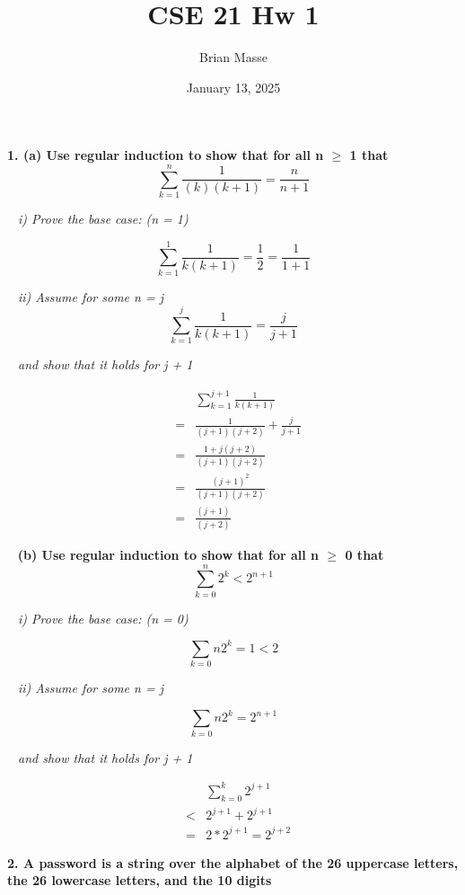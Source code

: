 \documentclass[12pt, letterpaper]{article}
\title{CSE 21 Hw 1}
\author{Brian Masse}
\date{January 13, 2025}
\begin{document}
\maketitle
\newpage

\bf{ 1. (a) Use regular induction to show that for all n $\ge$ 1 that }
\[ \sum_{k=1}^{n} \frac{1}{(k)(k+1)} = \frac{n}{n+1}  \]

\-\ \it{ i) Prove the base case: (n = 1) }

\[ \sum_{k=1}^{1} \frac{1}{k( k + 1 )} = \frac{1}{2} = \frac{1}{1 + 1} \]

\-\ \it{ ii) Assume for some n = j  }
\[ \sum_{k=1}^{j} \frac{1}{k( k + 1 )} = \frac{j}{j + 1}\]

\-\ \it{ and show that it holds for j + 1  }

\begin{eqnarray}
&& \sum_{k=1}^{j + 1} \frac{1}{k( k + 1 )}\\
&=& \frac{1}{(j + 1)(j + 2)} + \frac{j}{j + 1}\\
&=& \frac{1 + j(j + 2)}{(j + 1)(j + 2)} \\
&=& \frac{ (j + 1)^{2} }{(j + 1)(j + 2)} \\
&=& \frac{ (j + 1) }{(j + 2)}
\end{eqnarray}

\-\ \newline
\bf{ (b) Use regular induction to show that for all n $\ge$ 0 that }
\[ \sum_{k=0}^{n} 2^{k} < 2^{n + 1}  \]

\-\ \it{ i) Prove the base case: (n = 0) }

\[ \sum_{k=0}{n} 2^{k} = 1 < 2 \]


\-\ \it{ ii) Assume for some n = j  }

\[ \sum_{k=0}{n} 2^{k} = 2^{n + 1}\]

\-\ \it{ and show that it holds for j + 1  }

\begin{eqnarray}
&& \sum_{k=0}^{k} 2^{j + 1} \\
&<& 2^{j + 1} + 2^{j + 1} \\
&=& 2*2^{j +1 } = 2^{j + 2}
\end{eqnarray}


\newpage
\bf{ 2. A password is a string over the alphabet of the 26 uppercase letters, the 26 lowercase letters, and the 10 digits }
\end{document}
